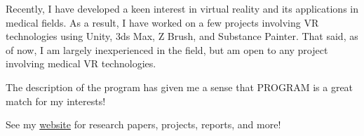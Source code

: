 \documentclass[a4paper,12pt,sans]{moderncv}
\begin{document}
Recently, I have developed a keen interest in virtual reality and its
applications in medical fields. As a result, I have worked on a few projects
involving VR technologies using Unity, 3ds Max, Z Brush, and Substance Painter.
That said, as of now, I am largely inexperienced in the field, but am open to
any project involving medical VR technologies.

The description of the program has given me a sense that PROGRAM is a great
match for my interests!

See my \href{https://www.davidoniani.com}{website} for research papers,
projects, reports, and more!

\makeletterclosing%
\end{document}
